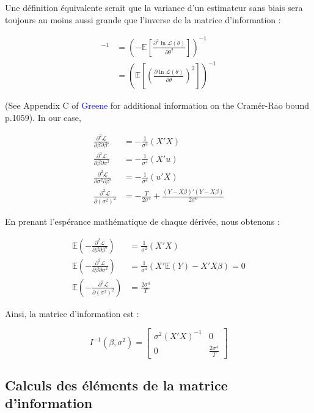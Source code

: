 \documentclass[14pt]{extarticle} %
\newcommand{\livre}[1]{\textcolor{blue}{#1}}
\begin{document}
Une définition équivalente serait que la variance d’un estimateur sans biais sera toujours au moins aussi grande que l’inverse de la matrice d’information :

\begin{align*}
[I(\theta)]^{-1} &= \left(-\mathbb{E} \left[ \frac{\partial^2 \ln \mathcal{L}(\theta)}{\partial \theta^2} \right] \right)^{-1} \\
&= \left(\mathbb{E} \left[ \left(\frac{\partial \ln \mathcal{L}(\theta)}{\partial \theta}\right)^2 \right] \right)^{-1}
\end{align*}

(See Appendix C of \livre{Greene} for additional information on the Cramér-Rao bound p.1059). In our case,

\begin{align*}
\frac{\partial^2 \mathcal{L}}{\partial \beta \partial \beta'} &= -\frac{1}{\sigma^2} (X'X) \\
\frac{\partial^2 \mathcal{L}}{\partial \beta \partial \sigma^2} &= -\frac{1}{\sigma^4} (X'u) \\
\frac{\partial^2 \mathcal{L}}{\partial \sigma^2 \partial \beta'} &= -\frac{1}{\sigma^4} (u'X) \\
\frac{\partial^2 \mathcal{L}}{\partial (\sigma^2)^2} &= -\frac{T}{2\sigma^4} + \frac{(Y - X\beta)'(Y - X\beta)}{2\sigma^6}
\end{align*}

En prenant l'espérance mathématique de chaque dérivée, nous obtenons :

\begin{align*}
\mathbb{E} \left( -\frac{\partial^2 \mathcal{L}}{\partial \beta \partial \beta'} \right) &= \frac{1}{\sigma^2} (X'X) \\
\mathbb{E} \left( -\frac{\partial^2 \mathcal{L}}{\partial \beta \partial \sigma^2} \right) &= \frac{1}{\sigma^4} (X'\mathbb{E}(Y) - X'X\beta) = 0 \\
\mathbb{E} \left( -\frac{\partial^2 \mathcal{L}}{\partial (\sigma^2)^2} \right) &= \frac{2\sigma^4}{T}
\end{align*}

Ainsi, la matrice d’information est :

\[
I^{-1}(\beta, \sigma^2) = \begin{bmatrix}
\sigma^2 (X'X)^{-1} & 0 \\
0 & \frac{2\sigma^4}{T}
\end{bmatrix}
\]

\subsection{Calculs des éléments de la matrice d’information}
\end{document}
